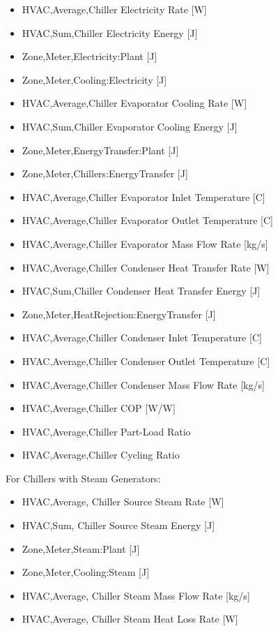 \begin{itemize}
\item
  HVAC,Average,Chiller Electricity Rate {[}W{]}
\item
  HVAC,Sum,Chiller Electricity Energy {[}J{]}
\item
  Zone,Meter,Electricity:Plant {[}J{]}
\item
  Zone,Meter,Cooling:Electricity {[}J{]}
\item
  HVAC,Average,Chiller Evaporator Cooling Rate {[}W{]}
\item
  HVAC,Sum,Chiller Evaporator Cooling Energy {[}J{]}
\item
  Zone,Meter,EnergyTransfer:Plant {[}J{]}
\item
  Zone,Meter,Chillers:EnergyTransfer {[}J{]}
\item
  HVAC,Average,Chiller Evaporator Inlet Temperature {[}C{]}
\item
  HVAC,Average,Chiller Evaporator Outlet Temperature {[}C{]}
\item
  HVAC,Average,Chiller Evaporator Mass Flow Rate {[}kg/s{]}
\item
  HVAC,Average,Chiller Condenser Heat Transfer Rate {[}W{]}
\item
  HVAC,Sum,Chiller Condenser Heat Transfer Energy {[}J{]}
\item
  Zone,Meter,HeatRejection:EnergyTransfer {[}J{]}
\item
  HVAC,Average,Chiller Condenser Inlet Temperature {[}C{]}
\item
  HVAC,Average,Chiller Condenser Outlet Temperature {[}C{]}
\item
  HVAC,Average,Chiller Condenser Mass Flow Rate {[}kg/s{]}
\item
  HVAC,Average,Chiller COP {[}W/W{]}
\item
  HVAC,Average,Chiller Part-Load Ratio
\item
  HVAC,Average,Chiller Cycling Ratio
\end{itemize}

For Chillers with Steam Generators:

\begin{itemize}
\item
  HVAC,Average, Chiller Source Steam Rate {[}W{]}
\item
  HVAC,Sum, Chiller Source Steam Energy {[}J{]}
\item
  Zone,Meter,Steam:Plant {[}J{]}
\item
  Zone,Meter,Cooling:Steam {[}J{]}
\item
  HVAC,Average, Chiller Steam Mass Flow Rate {[}kg/s{]}
\item
  HVAC,Average, Chiller Steam Heat Loss Rate {[}W{]}
\end{itemize}

